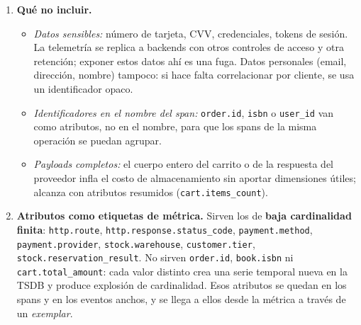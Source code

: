 \documentclass[variant=guia,cover=institutional,mode=screen]{ua-engineering-v6-article}
\begin{document}
\begin{uaanswer}
\begin{enumerate}
\item \textbf{Qué no incluir.}
\begin{itemize}
\item \emph{Datos sensibles:} número de tarjeta, CVV, credenciales, tokens de sesión. La telemetría se replica a backends con otros controles de acceso y otra retención; exponer estos datos ahí es una fuga. Datos personales (email, dirección, nombre) tampoco: si hace falta correlacionar por cliente, se usa un identificador opaco.
\item \emph{Identificadores en el nombre del span:} \texttt{order.id}, \texttt{isbn} o \texttt{user\_id} van como atributos, no en el nombre, para que los spans de la misma operación se puedan agrupar.
\item \emph{Payloads completos:} el cuerpo entero del carrito o de la respuesta del proveedor infla el costo de almacenamiento sin aportar dimensiones útiles; alcanza con atributos resumidos (\texttt{cart.items\_count}).
\end{itemize}

\item \textbf{Atributos como etiquetas de métrica.} Sirven los de \textbf{baja cardinalidad finita}: \texttt{http.route}, \texttt{http.response.status\_code}, \texttt{payment.method}, \texttt{payment.provider}, \texttt{stock.warehouse}, \texttt{customer.tier}, \texttt{stock.reservation\_result}. No sirven \texttt{order.id}, \texttt{book.isbn} ni \texttt{cart.total\_amount}: cada valor distinto crea una serie temporal nueva en la TSDB y produce explosión de cardinalidad. Esos atributos se quedan en los spans y en los eventos anchos, y se llega a ellos desde la métrica a través de un \emph{exemplar}.
\end{enumerate}
\end{uaanswer}
\end{document}
